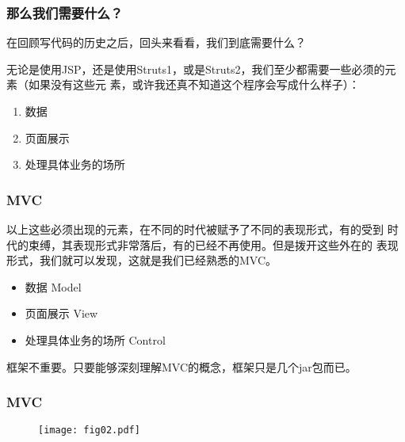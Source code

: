 \begin{frame}[fragile] %
\frametitle{那么我们需要什么？}

在回顾写代码的历史之后，回头来看看，我们到底需要什么？ 

无论是使用JSP，还是使用Struts1，或是Struts2，我们至少都需要一些必须的元素（如果没有这些元
素，或许我还真不知道这个程序会写成什么样子）：

\begin{enumerate}[<+-| alert@+>]
\item {\hei 数据} 
\item {\hei 页面展示} 
\item {\hei 处理具体业务的场所} 
\end{enumerate}
\end{frame}

\begin{frame}[fragile] %
  \frametitle{MVC}

  以上这些必须出现的元素，在不同的时代被赋予了不同的表现形式，有的受到
  时代的束缚，其表现形式非常落后，有的已经不再使用。但是拨开这些外在的
  表现形式，我们就可以发现，这就是我们已经熟悉的MVC。

  \begin{itemize}
  \item 数据  Model 
  \item 页面展示  View 
  \item 处理具体业务的场所  Control 
  \end{itemize}

  {\hei\Red 框架不重要。只要能够深刻理解MVC的概念，框架只是几个jar包而已。}
\end{frame}

\begin{frame}[fragile] %
\frametitle{MVC}

\begin{figure}
\centering
\texttt{[image: fig02.pdf]}
\end{figure}
\end{frame}

